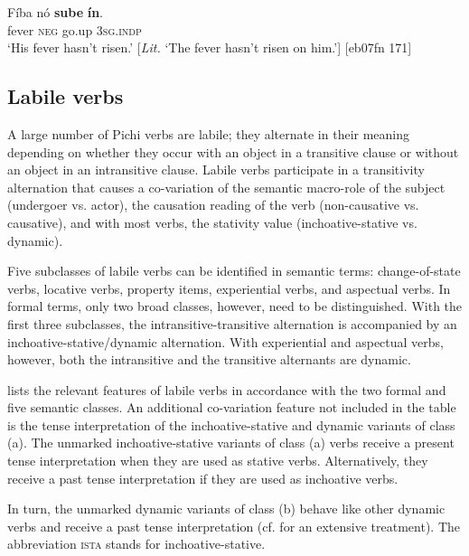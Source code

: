 \ea%
    \label{ex:key:1108}
    \gll Fíba    nó  \textbf{sube}  \textbf{ín}.\\
fever  \textsc{neg}  go.up  \textsc{3sg.indp}\\

\glt ‘His fever hasn’t risen.’ [\textit{Lit.} ‘The fever hasn’t risen on him.’] [eb07fn 171]
\z

\subsection{Labile verbs} \label{sec:9.2.3}

A large number of Pichi verbs are labile; they alternate in their meaning depending on whether they occur with an object in a transitive clause or without an object in an intransitive clause. Labile verbs participate in a transitivity alternation that causes a co-variation of the semantic macro-role of the subject (undergoer vs. actor), the causation reading of the verb (non-causative vs. causative), and with most verbs, the stativity value (inchoative-stative vs. dynamic).


Five subclasses of labile verbs can be identified in semantic terms: change-of-state verbs, locative verbs, property items, experiential verbs, and aspectual verbs. In formal terms, only two broad classes, however, need to be distinguished. With the first three subclasses, the intransitive-transitive alternation is accompanied by an inchoative-stative/dynamic alternation. With experiential and aspectual verbs, however, both the intransitive and the transitive alternants are dynamic. 


 lists the relevant features of labile verbs in accordance with the two formal and five semantic classes. An additional co-variation feature not included in the table is the tense interpretation of the inchoative-stative and dynamic variants of class (a). The unmarked inchoative-stative variants of class (a) verbs receive a present tense interpretation when they are used as stative verbs. Alternatively, they receive a past tense interpretation if they are used as inchoative verbs.

In turn, the unmarked dynamic variants of class (b) behave like other dynamic verbs and receive a past tense interpretation (cf.  for an extensive treatment). The abbreviation \textsc{ista} stands for inchoative-stative. 


